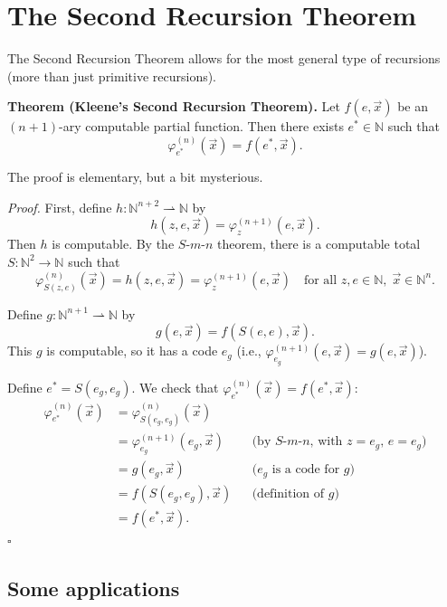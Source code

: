 \documentclass[11pt]{article}
\begin{document}
\section{The Second Recursion Theorem}

The Second Recursion Theorem allows for the most general type of recursions (more than just primitive recursions).

\textbf{Theorem (Kleene's Second Recursion Theorem).} Let $f(e, \vec{x})$ be an $(n+1)$-ary computable partial function. Then there exists $e^* \in \mathbb{N}$ such that
\[
    \varphi_{e^*}^{(n)}(\vec{x}) = f(e^*, \vec{x}).
\]

The proof is elementary, but a bit mysterious.

\textit{Proof.} First, define $h\colon \mathbb{N}^{n+2} \rightharpoonup \mathbb{N}$ by
\[
    h(z, e, \vec{x}) = \varphi_z^{(n+1)}(e, \vec{x}).
\]
Then $h$ is computable. By the $S$-$m$-$n$ theorem, there is a computable total $S\colon \mathbb{N}^2 \to \mathbb{N}$ such that
\[
    \varphi_{S(z,e)}^{(n)}(\vec{x}) = h(z, e, \vec{x}) = \varphi_z^{(n+1)}(e, \vec{x}) \quad \text{for all } z, e \in \mathbb{N},\; \vec{x} \in \mathbb{N}^n.
\]

Define $g\colon \mathbb{N}^{n+1} \rightharpoonup \mathbb{N}$ by
\[
    g(e, \vec{x}) = f(S(e, e), \vec{x}).
\]
This $g$ is computable, so it has a code $e_g$ (i.e., $\varphi_{e_g}^{(n+1)}(e, \vec{x}) = g(e, \vec{x})$).

Define $e^* = S(e_g, e_g)$. We check that $\varphi_{e^*}^{(n)}(\vec{x}) = f(e^*, \vec{x})$:
\begin{align*}
    \varphi_{e^*}^{(n)}(\vec{x}) &= \varphi_{S(e_g, e_g)}^{(n)}(\vec{x}) \\
    &= \varphi_{e_g}^{(n+1)}(e_g, \vec{x}) && \text{(by $S$-$m$-$n$, with $z = e_g$, $e = e_g$)} \\
    &= g(e_g, \vec{x}) && \text{($e_g$ is a code for $g$)} \\
    &= f(S(e_g, e_g), \vec{x}) && \text{(definition of $g$)} \\
    &= f(e^*, \vec{x}).
\end{align*}
\hfill$\square$

\subsection{Some applications}
\end{document}
